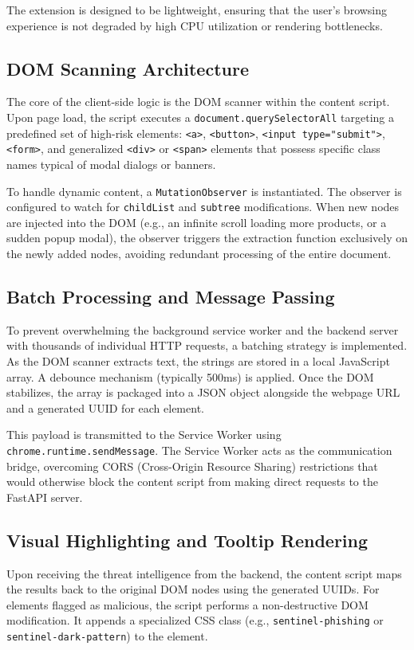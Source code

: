 The extension is designed to be lightweight, ensuring that the user's browsing experience is not degraded by high CPU utilization or rendering bottlenecks.

\subsection{DOM Scanning Architecture}
The core of the client-side logic is the DOM scanner within the content script. Upon page load, the script executes a \texttt{document.querySelectorAll} targeting a predefined set of high-risk elements: \texttt{<a>}, \texttt{<button>}, \texttt{<input type="submit">}, \texttt{<form>}, and generalized \texttt{<div>} or \texttt{<span>} elements that possess specific class names typical of modal dialogs or banners.

To handle dynamic content, a \texttt{MutationObserver} is instantiated. The observer is configured to watch for \texttt{childList} and \texttt{subtree} modifications. When new nodes are injected into the DOM (e.g., an infinite scroll loading more products, or a sudden popup modal), the observer triggers the extraction function exclusively on the newly added nodes, avoiding redundant processing of the entire document.

\subsection{Batch Processing and Message Passing}
To prevent overwhelming the background service worker and the backend server with thousands of individual HTTP requests, a batching strategy is implemented. As the DOM scanner extracts text, the strings are stored in a local JavaScript array. A debounce mechanism (typically 500ms) is applied. Once the DOM stabilizes, the array is packaged into a JSON object alongside the webpage URL and a generated UUID for each element.

This payload is transmitted to the Service Worker using \texttt{chrome.runtime.sendMessage}. The Service Worker acts as the communication bridge, overcoming CORS (Cross-Origin Resource Sharing) restrictions that would otherwise block the content script from making direct requests to the FastAPI server.

\subsection{Visual Highlighting and Tooltip Rendering}
Upon receiving the threat intelligence from the backend, the content script maps the results back to the original DOM nodes using the generated UUIDs. For elements flagged as malicious, the script performs a non-destructive DOM modification. It appends a specialized CSS class (e.g., \texttt{sentinel-phishing} or \texttt{sentinel-dark-pattern}) to the element.


